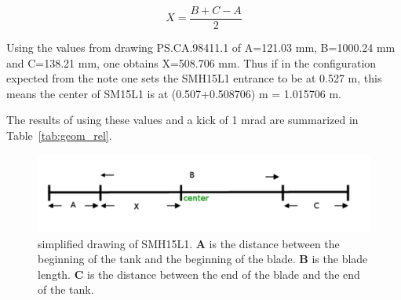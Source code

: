 \documentclass[11pt,letter,english]{article}
\begin{document}
\begin{equation}
X = \frac{B+C-A}{2}
\end{equation}

Using the values from drawing PS.CA.98411.1 of A=121.03 mm, B=1000.24 mm and
C=138.21 mm, one obtains X=508.706 mm. Thus if in the configuration expected from
the note one sets the SMH15L1 entrance to be at 0.527 m, this means the center
of SM15L1 is at (0.507+0.508706) m = 1.015706 m.

The results of using these values and a kick of 1 mrad are summarized in Table~\ref{tab:geom_rel}.

\begin{figure}[!hbtp]
  \begin{center}
    \includegraphics[width=1.0\textwidth]{figs/smh15l1.pdf}
    \caption{simplified drawing of SMH15L1. {\bf A} is the distance between the beginning of the tank and the beginning of the blade. {\bf B} is the blade length. 
      {\bf C} is the distance between the end of the blade and the end of the tank.}
    \label{fig:smh15l1_simplified}
  \end{center}
\end{figure}
\end{document}
